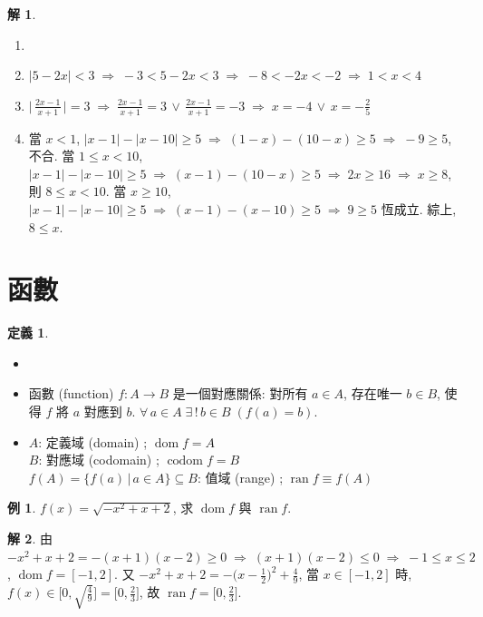 \documentclass[12pt]{extarticle}
\newcommand{\ds}{\displaystyle}
\newcommand{\ie}{\;\Longrightarrow\;}
\DeclareMathOperator*{\dom}{dom}
\DeclareMathOperator*{\codom}{codom}
\DeclareMathOperator*{\ran}{ran}
\theoremstyle{definition}
\newtheorem*{dfn}{定義}
\newtheorem*{ex}{例}
\newtheorem*{sol}{解}
\begin{document}
\begin{sol}
  \begin{enumerate}\setlength\itemsep{0em}
    \item[]
    \item $\ds |5 - 2x| < 3 \ie -3 < 5 - 2x < 3 \ie -8 < -2x < -2 \ie 1 < x < 4$
    \item $\ds \Big|\,\frac{2 x - 1}{x + 1}\,\Big| = 3 \ie \frac{2 x - 1}{x + 1} = 3\,\vee\,\frac{2 x - 1}{x + 1} = -3 \ie x = -4 \,\vee\, x = -\frac{2}{5}$
    \item 當 $x < 1$, $\ds |x - 1| - |x - 10|\geqslant 5 \ie (1 - x) - (10 - x)\geqslant 5 \ie -9 \geqslant 5$, 不合. 當 $1\leqslant x < 10$, $\ds |x - 1| - |x - 10|\geqslant 5 \ie (x - 1) - (10 - x)\geqslant 5 \ie 2 x\geqslant 16 \ie x\geqslant 8$, 則 $8\leqslant x < 10$. 當 $x\geqslant 10$, $\ds |x - 1| - |x - 10|\geqslant 5 \ie (x - 1) - (x - 10)\geqslant 5 \ie 9\geqslant 5$ 恆成立. 綜上, $8\leqslant x$. 
  \end{enumerate}
\end{sol}

\section*{函數}

\begin{dfn}
  \begin{itemize}\setlength\itemsep{0em}
    \item[]
    \item 函數 (function) $f:A\to B$ 是一個對應關係: 對所有 $a\in A$, 存在唯一 $b\in B$, 使得 $f$ 將 $a$ 對應到 $b$. $\ds\forall\,a\in A\;\exists\,!\,b\in B\;(f(a) = b)$.
    \item $A$:  定義域 (domain) ;  $\dom f = A$ \\
          $B$:  對應域 (codomain) ;  $\codom f = B$ \\
          $f(A) = \{f(a)\,|\,a\in A\}\subseteq B$: 值域 (range) ; $\ran f \equiv f(A)$      
  \end{itemize}
\end{dfn}

\begin{ex}
  $f(x) = \sqrt{-x^2 + x + 2}$, 求 $\dom f$ 與 $\ran f$. 
\end{ex}

\begin{sol}
  由 $-x^2 + x + 2 = -(x + 1)(x - 2)\geqslant 0 \ie (x + 1)(x - 2)\leqslant 0 \ie -1\leqslant x\leqslant 2$, $\dom f = [-1, 2]$. 又 $\ds -x^2 + x + 2 = -\Big(x - \frac{1}{2}\Big)^2 + \frac{4}{9}$, 當 $x\in [-1,2]$ 時, $\ds f(x)\in\Big[0, \sqrt{\frac{4}{9}}\Big] = \Big[0, \frac{2}{3}\Big]$, 故 $\ds\ran f = \Big[0, \frac{2}{3}\Big]$. 
\end{sol}
\end{document}
